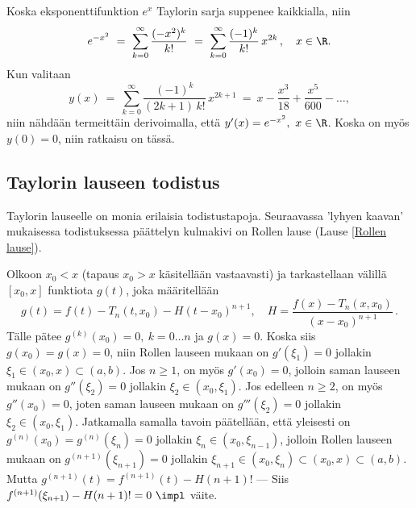 \ratk Koska eksponenttifunktion $e^x$ Taylorin sarja suppenee kaikkialla, niin
\[ 
e^{-x^2}\ =\ \sum_{k=0}^\infty \frac{(-x^2)^k}{k!}\ 
          =\ \sum_{k=0}^\infty \frac{(-1)^k}{k!}\,x^{2k}\,, \quad x \in \R. 
\]
Kun valitaan
\[ 
y(x)\ =\ \sum_{k=0}^\infty \frac{(-1)^k}{(2k+1)\,k!}\,x^{2k+1}\ 
      =\ x - \frac{x^3}{18} + \frac{x^5}{600} - \ldots, 
\]
niin nähdään termeittäin derivoimalla, että $y'(x)=e^{-x^2},\ x\in\R$. Koska on myös $y(0)=0$,
niin ratkaisu on tässä. \loppu

\subsection{Taylorin lauseen todistus}

Taylorin lauseelle on monia erilaisia todistustapoja. Seuraavassa
'lyhyen kaavan' mukaisessa todistuksessa päättelyn kulmakivi on Rollen lause
(Lause \ref{Rollen lause}).

Olkoon $x_0<x$ (tapaus $x_0>x$ käsitellään vastaavasti) ja tarkastellaan välillä $[x_0,x]$
funktiota $g(t)$, joka määritellään
\[
g(t) = f(t) - T_n(t,x_0) - H(t-x_0)^{n+1}, \quad H = \frac{f(x)-T_n(x,x_0)}{(x-x_0)^{n+1}}\,. 
\]
Tälle pätee $g^{(k)}(x_0)=0,\ k=0 \ldots n$ ja $g(x)=0$. Koska siis $g(x_0)=g(x)=0$, niin
Rollen lauseen mukaan on $g'(\xi_1)=0$ jollakin $\xi_1 \in (x_0,x)\subset(a,b)$. Jos $n \ge 1$,
on myös $g'(x_0)=0$, jolloin saman lauseen mukaan on $g''(\xi_2)=0$ jollakin
$\xi_2 \in (x_0,\xi_1)$. Jos edelleen $n \ge 2$, on myös $g''(x_0)=0$, joten saman lauseen
mukaan on $g'''(\xi_2)=0$ jollakin $\xi_2\in(x_0,\xi_1)$. Jatkamalla samalla tavoin päätellään,
että yleisesti on $g^{(n)}(x_0)=g^{(n)}(\xi_n)=0$ jollakin $\xi_n \in (x_0,\xi_{n-1})$, jolloin
Rollen lauseen mukaan on $g^{(n+1)}(\xi_{n+1})=0$ jollakin 
$\xi_{n+1} \in (x_0,\xi_n) \subset (x_0,x) \subset (a,b)$. Mutta 
$g^{(n+1)}(t) = f^{(n+1)}(t)-H(n+1)!$ --- Siis $f^{(n+1)}(\xi_{n+1})-H(n+1)!=0\ \impl$ väite.
\loppu

